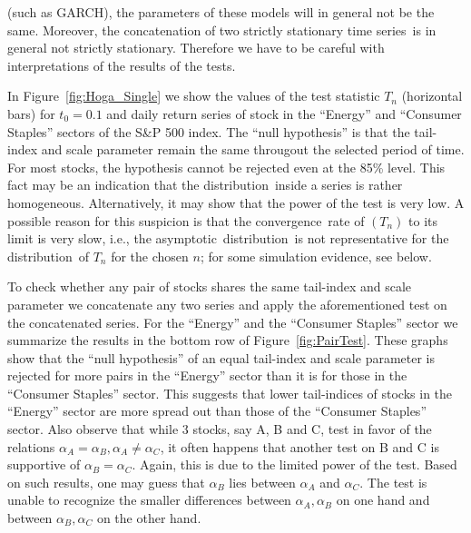 \documentclass[11pt,a4]{amsart}
\newcommand{\asy}{asymptotic}
\newcommand{\ts}{time series}
\newcommand{\con}{convergence}
\newcommand{\ds}{distribution}
\newcommand{\1}{{\mathbf 1}}
\begin{document}
(such as GARCH), the parameters of these models will in general not be the same. Moreover, the concatenation
of two strictly stationary \ts\ is in general not strictly stationary. Therefore we have to be careful
with interpretations of the results of the tests.
\par 
In Figure~\ref{fig:Hoga_Single} we show the values of the test statistic $T_n$ (horizontal bars)
for $t_0=0.1$ and daily return series of stock in the ``Energy'' and ``Consumer Staples'' sectors of the S\&P
500 index. The ``null hypothesis'' is that the tail-index and scale parameter remain the
same througout the selected period of time. For most stocks, the hypothesis cannot be rejected even at the 85\% level.
This fact may be an indication that the \ds\ inside a series is rather homogeneous.
Alternatively, it may show that the power of the test is very low. A possible reason for this suspicion is that the \con\ rate
of $(T_n)$ to its limit is very slow, i.e., the \asy\ \ds\ is not representative for the \ds\ of $T_n$ for the chosen $n$; for some
simulation evidence, see below.
\par
To check whether any pair of stocks shares the same tail-index and scale parameter we concatenate
any two series and apply the aforementioned test on the concatenated series. For the ``Energy'' and the
``Consumer Staples'' sector we summarize the results in the bottom row of Figure~\ref{fig:PairTest}.
These graphs show that the ``null
hypothesis'' of an equal tail-index and scale parameter is rejected for more pairs in the
``Energy'' sector than it is for those in the ``Consumer Staples''
sector. This suggests that lower tail-indices of stocks in the
``Energy'' sector are more spread out than those of the ``Consumer
Staples'' sector. Also observe that while 3 stocks, say A, B and C, test in favor of
the relations $\alpha_A = \alpha_B, \alpha_A \neq \alpha_C$, it often
happens that another test on B and C is supportive of $\alpha_B = \alpha_C$. Again,
this is due to the limited power of the test. Based
on such results, one may guess that $\alpha_B$ lies between $\alpha_A$ and
$\alpha_C$. The test is unable to recognize the smaller differences
between $\alpha_A, \alpha_B$ on one hand and between $\alpha_B, \alpha_C$ on the other hand.
\end{document}
